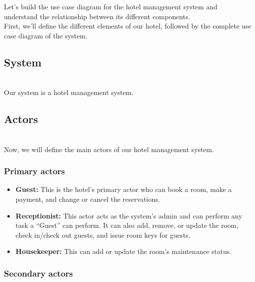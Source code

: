 

Let's build the use case diagram for the hotel management system and understand the relationship between its different components.
\\
First, we'll define the different elements of our hotel, followed by the complete use case diagram of the system.

\subsection{System}\label{RxhXFZr24J4z0Y-SxdLGp}
\\
Our system is a hotel management system.

\subsection{Actors}\label{vY83yHaWwEDIxBOmUAqfP}
\\
Now, we will define the main actors of our hotel management system.

\subsubsection{Primary actors}\label{sfiQ3lBp7ajlxfOJRg2oK}

\begin{itemize}
\item
\protect{}\label{xdhJn-TOF2CirWUYVqwQt}
\textbf{Guest:} This is the hotel's primary actor who can book a room, make a payment, and change or cancel the reservations.
\item
\protect{}\label{Uyri0RTGKXIvmHh22pBmy}
\textbf{Receptionist:} This actor acts as the system's admin and can perform any task a ``Guest'' can perform. It can also add, remove, or update the room, check in/check out guests, and issue room keys for guests.
\item
\protect{}\label{FdwTw8JYA_2esowVNKV9h}
\textbf{Housekeeper:} This can add or update the room's maintenance status.
\end{itemize}

\subsubsection{Secondary actors}\label{AYuR332ygFUjA3AGa5nIr}

